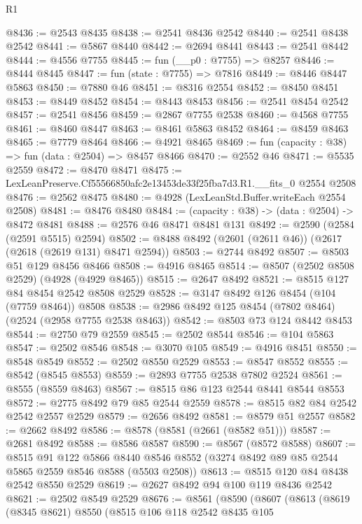 \begin{lexlean}{R1}
\begin{coremodule}
@8436 := @2543 @8435
@8438 := @2541 @8436 @2542
@8440 := @2541 @8438 @2542
@8441 := @5867 @8440
@8442 := @2694 @8441
@8443 := @2541 @8442
@8444 := @4556 @7755
@8445 := fun (__p0 : @7755) => @8257
@8446 := @8444 @8445
@8447 := fun (state : @7755) => @7816
@8449 := @8446 @8447 @5863
@8450 := @7880 @46
@8451 := @8316 @2554
@8452 := @8450 @8451
@8453 := @8449 @8452
@8454 := @8443 @8453
@8456 := @2541 @8454 @2542
@8457 := @2541 @8456
@8459 := @2867 @7755 @2538
@8460 := @4568 @7755
@8461 := @8460 @8447
@8463 := @8461 @5863 @8452
@8464 := @8459 @8463
@8465 := @7779 @8464
@8466 := @4921 @8465
@8469 := fun (capacity : @38) => fun (data : @2504) => @8457 @8466
@8470 := @2552 @46
@8471 := @5535 @2559
@8472 := @8470 @8471
@8475 := LexLeanPreserve.Cf55566850afc2e13453de33f25fba7d3.R1.__fits_0 @2554 @2508
@8476 := @2562 @8475
@8480 := @4928 (LexLeanStd.Buffer.writeEach @2554 @2508)
@8481 := @8476 @8480
@8484 := (capacity : @38) -> (data : @2504) -> @8472 @8481
@8488 := @2576 @46 @8471 @8481 @131
@8492 := @2590 (@2584 (@2591 @5515) @2594)
@8502 := @8488 @8492 (@2601 (@2611 @46)) (@2617 (@2618 (@2619 @131) @8471 @2594))
@8503 := @2744 @8492
@8507 := @8503 @51 @129 @8456 @8466
@8508 := @4916 @8465
@8514 := @8507 (@2502 @8508 @2529) (@4928 (@4929 @8465))
@8515 := @2647 @8492
@8521 := @8515 @127 @84 @8454 @2542 @8508 @2529
@8528 := @3147 @8492 @126 @8454 (@104 (@7759 @8464)) @8508
@8538 := @2986 @8492 @125 @8454 (@7802 @8464) (@2524 (@2958 @7755 @2538 @8463))
@8542 := @8503 @73 @124 @8442 @8453
@8544 := @2750 @79 @2559
@8545 := @2502 @8544
@8546 := @104 @5863
@8547 := @2502 @8546
@8548 := @3070 @105
@8549 := @4916 @8451
@8550 := @8548 @8549
@8552 := @2502 @8550 @2529
@8553 := @8547 @8552
@8555 := @8542 (@8545 @8553)
@8559 := @2893 @7755 @2538 @7802 @2524
@8561 := @8555 (@8559 @8463)
@8567 := @8515 @86 @123 @2544 @8441 @8544 @8553
@8572 := @2775 @8492 @79 @85 @2544 @2559
@8578 := @8515 @82 @84 @2542 @2542 @2557 @2529
@8579 := @2656 @8492
@8581 := @8579 @51 @2557
@8582 := @2662 @8492
@8586 := @8578 (@8581 (@2661 (@8582 @51)))
@8587 := @2681 @8492
@8588 := @8586 @8587
@8590 := @8567 (@8572 @8588)
@8607 := @8515
    @91
    @122
    @5866
    @8440
    @8546
    @8552
    (@3274 @8492 @89 @85 @2544 @5865 @2559 @8546 @8588 (@5503 @2508))
@8613 := @8515 @120 @84 @8438 @2542 @8550 @2529
@8619 := @2627 @8492 @94 @100 @119 @8436 @2542
@8621 := @2502 @8549 @2529
@8676 := @8561
    (@8590
      (@8607
        (@8613
          (@8619
            (@8345 @8621)
            @8550
            (@8515
              @106
              @118
              @2542
              @8435
              @105

\end{coremodule}
\end{lexlean}
